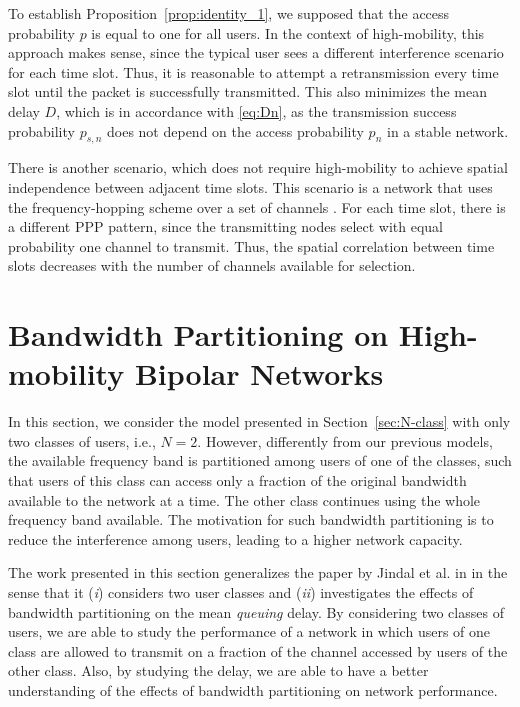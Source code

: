 To establish Proposition~\ref{prop:identity_1}, we supposed that the access probability $p$ is equal to one for all users. In the context of high-mobility, this approach makes sense, since the typical user sees a different interference scenario for each time slot. Thus, it is reasonable to attempt a retransmission every time slot until the packet is successfully transmitted. This also minimizes the mean delay $D$, which is in accordance with \eqref{eq:Dn}, as the transmission success probability $p_{s,n}$ does not depend on the access probability $p_n$ in a stable network.

There is another scenario, which does not require high-mobility to achieve spatial independence between adjacent time slots. This scenario is a network that uses the frequency-hopping scheme over a set of channels \cite{tse2005fundamentals}. For each time slot, there is a different PPP pattern, since the transmitting nodes select with equal probability one channel to transmit. Thus, the spatial correlation between time slots decreases with the number of channels available for selection.

\section{Bandwidth Partitioning on High-mobility Bipolar Networks}
\label{sec:bandwidth}

In this section, we consider the model presented in Section~\ref{sec:N-class} with only two classes of users, i.e., $N=2$.
%
However, differently from our previous models, the available frequency band is partitioned among users of one of the classes, such that users of this class can access only a fraction of the original bandwidth available to the network at a time.
%
The other class continues using the whole frequency band available.
%
The motivation for such bandwidth partitioning is to reduce the interference among users, leading to a higher network capacity.

The work presented in this section generalizes the paper by Jindal et al. in \cite{jindal2008bandwidth} in the sense that it (\textit{i}) considers two user classes and (\textit{ii}) investigates the effects of bandwidth partitioning on the mean \textit{queuing} delay.
%
By considering two classes of users, we are able to study the performance of a network in which users of one class are allowed to transmit on a fraction of the channel accessed by users of the other class. Also, by studying the delay, we are able to have a better understanding of the effects of bandwidth partitioning on network performance.
%

